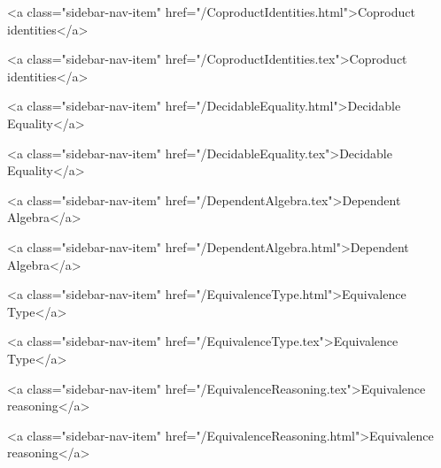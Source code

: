       
    
      
        
          <a class="sidebar-nav-item" href="/CoproductIdentities.html">Coproduct identities</a>
        
      
    
      
        
          <a class="sidebar-nav-item" href="/CoproductIdentities.tex">Coproduct identities</a>
        
      
    
      
        
          <a class="sidebar-nav-item" href="/DecidableEquality.html">Decidable Equality</a>
        
      
    
      
        
          <a class="sidebar-nav-item" href="/DecidableEquality.tex">Decidable Equality</a>
        
      
    
      
        
          <a class="sidebar-nav-item" href="/DependentAlgebra.tex">Dependent Algebra</a>
        
      
    
      
        
          <a class="sidebar-nav-item" href="/DependentAlgebra.html">Dependent Algebra</a>
        
      
    
      
        
          <a class="sidebar-nav-item" href="/EquivalenceType.html">Equivalence Type</a>
        
      
    
      
        
          <a class="sidebar-nav-item" href="/EquivalenceType.tex">Equivalence Type</a>
        
      
    
      
        
          <a class="sidebar-nav-item" href="/EquivalenceReasoning.tex">Equivalence reasoning</a>
        
      
    
      
        
          <a class="sidebar-nav-item" href="/EquivalenceReasoning.html">Equivalence reasoning</a>
        
      
    
      
        

